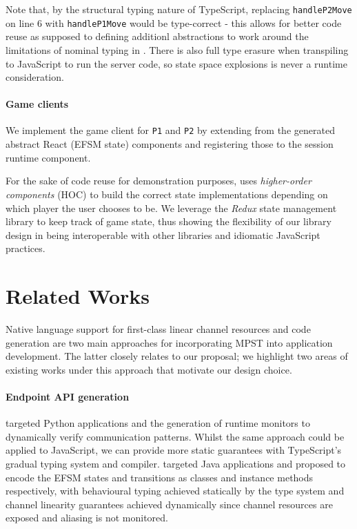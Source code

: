 \documentclass[submission,copyright,creativecommons]{eptcs}
\begin{document}
Note that, by the structural typing nature of TypeScript, replacing \texttt{handleP2Move} on line 6 with \texttt{handleP1Move} would be type-correct - this allows for better code reuse as supposed to defining additionl abstractions to work around the limitations of nominal typing in \cite{Hybrid2016}. There is also full type erasure when transpiling to JavaScript to run the server code, so state space explosions is never a runtime consideration.

\paragraph{Game clients} We implement the game client for \texttt{P1} and \texttt{P2} by extending from the generated abstract React (EFSM state) components and registering those to the session runtime component.

For the sake of code reuse for demonstration purposes, \cite{NoughtsAndCrosses} uses \textit{higher-order components} (HOC) to build the correct state implementations depending on which player the user chooses to be. We leverage the \textit{Redux} state management library to keep track of game state, thus showing the flexibility of our library design in being interoperable with other libraries and idiomatic JavaScript practices. 

\section{Related Works}
Native language support for first-class linear channel resources \cite{ATS} and code generation are two main approaches for incorporating MPST into application development. The latter closely relates to our proposal; we highlight two areas of existing works under this approach that motivate our design choice.

\paragraph{Endpoint API generation} \cite{Python2017} targeted Python applications and the generation of runtime monitors to dynamically verify communication patterns. Whilst the same approach could be applied to JavaScript, we can provide more static guarantees with TypeScript's gradual typing system and compiler. \cite{Hybrid2016} targeted Java applications and proposed to encode the EFSM states and transitions as classes and instance methods respectively, with behavioural typing achieved statically by the type system and channel linearity guarantees achieved dynamically since channel resources are exposed and aliasing is not monitored.
\end{document}
